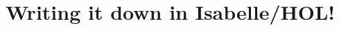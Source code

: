 \documentclass[aspectratio=169,10pt]{beamer}
\begin{document}
\section{Writing it down in Isabelle/HOL!}

\end{document}

